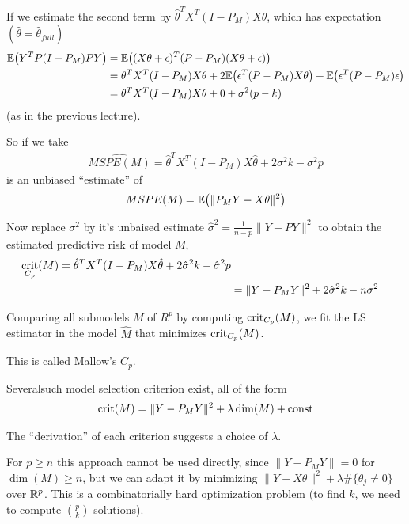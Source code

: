 If we estimate the second term by $\hat \theta^{T} X^{T} (I - P_{M}) X
\hat \theta$, which has expectation $(\hat \theta = \hat
\theta_{full})$
\begin{align}
  \label{eq:108}
  \E{Y^{T} P(I - P_{M})PY} &= \E{(X\theta + \epsilon)^{T} (P - P_{M})
    (X \theta + \epsilon)} \\
  &= \theta^{T} X^{T} (I - P_{M}) X \theta + 2 \E{\epsilon^{T}(P -
    P_{M}) X \theta} + \E{\epsilon^{T}(P - P_{M}) \epsilon} \\
  &= \theta^{T} X^{T} (I - P_{M}) X \theta + 0 + \sigma^{2} ( p - k)
\end{align} (as in the previous lecture).

So if we take
\begin{align}
  \label{eq:109}
  \hat{MSPE(M)} = \hat \theta^{T} X^{T}(I - P_{M}) X \hat \theta + 2
  \sigma^{2} k - \sigma^{2} p
\end{align} is an unbiased ``estimate'' of
\begin{align}
  \label{eq:110}
  MSPE(M) = \E{\| P_{M}Y - X \theta \|^{2}}
\end{align}

Now replace $\sigma^{2}$ by it's unbaised estimate $\hat \sigma^{2} =
\frac{1}{n-p} \| Y - PY \|^{2}$ to obtain the estimated predictive
risk of model $M$,
\begin{align}
  \label{eq:111}
  \operatorname*{crit}_{C_{p}} (M) = \hat \theta^{T} X^{T} (I - P_{M})X \hat \theta +
  2 \hat \sigma^{2} k - \hat \sigma^{2} p \\
  &= \| Y - P_{M} Y \|^{2} + 2 \hat \sigma^{2} k - n \sigma^{2}
\end{align}

Comparing all submodels $M$ of $R^{p}$ by computing
$\operatorname*{crit}_{C_{p}}(M)$, we fit the LS estimator in the model $\hat M$ that
minimizes $\operatorname*{crit}_{C_{p}}(M)$.

This is called Mallow's $C_{p}$.

Severalsuch model selection criterion exist, all of the form
\begin{align}
  \label{eq:112}
  \operatorname*{crit}(M) = \| Y - P_{M} Y \|^{2} + \lambda \dim(M) + \text{const}
\end{align}

The ``derivation'' of each criterion suggests a choice of $\lambda$.

For $p \geq n$ this approach cannot be used directly, since $\| Y - P_{M}
Y \| = 0$ for $\dim(M) \geq n$, but we can adapt it by minimizing $\|
Y - X \theta \|^{2} + \lambda \#\{\theta_{j} \neq 0 \}$ over $\mathbb{R}^{p}$.
This is a combinatorially hard optimization problem (to find $k$, we
need to compute $p \choose k$ solutions).

